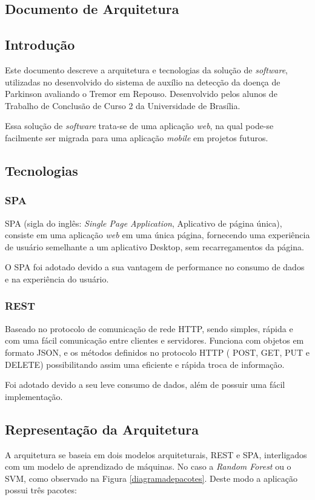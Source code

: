 \begin{anexosenv}

    \partanexos
    \chapter{Documento de Arquitetura}
    \label{adoarquitetura}
    \section{Introdução}
    Este documento descreve a arquitetura e tecnologias da solução de \textit{software}, utilizadas no desenvolvido do sistema de auxílio na detecção da doença de Parkinson avaliando o Tremor em Repouso. Desenvolvido pelos alunos de Trabalho de Conclusão de Curso 2 da Universidade de Brasília.

    Essa solução de \textit{software} trata-se de uma aplicação \textit{web}, na qual pode-se facilmente ser migrada para uma aplicação \textit{mobile} em projetos futuros.

    \section{Tecnologias}
    \subsection{SPA}
    SPA (sigla do inglês: \textit{Single Page Application}, Aplicativo de página única), consiste em uma aplicação \textit{web} em uma única página, fornecendo uma experiência de usuário semelhante a um aplicativo Desktop, sem recarregamentos da página.

   O SPA foi adotado devido a sua vantagem de performance no consumo de dados e na experiência do usuário.

    \subsection{REST}
    Baseado no protocolo de comunicação de rede HTTP, sendo simples, rápida e com uma fácil comunicação entre clientes e servidores. Funciona com objetos em formato JSON, e os métodos definidos no protocolo HTTP ( POST, GET, PUT e DELETE) possibilitando assim uma eficiente e rápida troca de informação.

   Foi adotado devido a seu leve consumo de dados, além de possuir uma fácil implementação.

    \section{Representação da Arquitetura}
    A arquitetura se baseia em dois modelos arquiteturais, REST e SPA, interligados com um modelo de aprendizado de máquinas. No caso a \textit{Random Forest} ou o SVM, como observado na Figura \ref{diagramadepacotes}. Deste modo a aplicação possui três pacotes:


\end{anexosenv}
